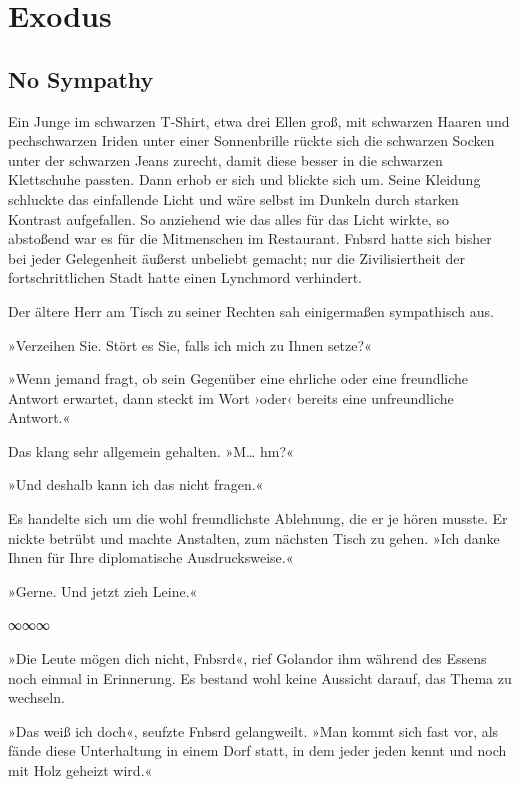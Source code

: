 \part{Exodus}

\chapter{No Sympathy}

Ein Junge im schwarzen T-Shirt, etwa drei Ellen groß, mit schwarzen Haaren und pechschwarzen Iriden unter einer Sonnenbrille rückte sich die schwarzen Socken unter der schwarzen Jeans zurecht, damit diese besser in die schwarzen Klettschuhe passten. Dann erhob er sich und blickte sich um. Seine Kleidung schluckte das einfallende Licht und wäre selbst im Dunkeln durch starken Kontrast aufgefallen. So anziehend wie das alles für das Licht wirkte, so abstoßend war es für die Mitmenschen im Restaurant. Fnbsrd hatte sich bisher bei jeder Gelegenheit äußerst unbeliebt gemacht; nur die Zivilisiertheit der fortschrittlichen Stadt hatte einen Lynchmord verhindert.

Der ältere Herr am Tisch zu seiner Rechten sah einigermaßen sympathisch aus.

»Verzeihen Sie. Stört es Sie, falls ich mich zu Ihnen setze?«

»Wenn jemand fragt, ob sein Gegenüber eine ehrliche oder eine freundliche Antwort erwartet, dann steckt im Wort ›oder‹ bereits eine unfreundliche Antwort.«

Das klang sehr allgemein gehalten. »M… hm?«

»Und deshalb kann ich das nicht fragen.«

Es handelte sich um die wohl freundlichste Ablehnung, die er je hören musste. Er nickte betrübt und machte Anstalten, zum nächsten Tisch zu gehen. »Ich danke Ihnen für Ihre diplomatische Ausdrucksweise.«

»Gerne. Und jetzt zieh Leine.«

\begin{center}
∞∞∞
\end{center}

»Die Leute mögen dich nicht, Fnbsrd«, rief Golandor ihm während des Essens noch einmal in Erinnerung. Es bestand wohl keine Aussicht darauf, das Thema zu wechseln.

»Das weiß ich doch«, seufzte Fnbsrd gelangweilt. »Man kommt sich fast vor, als fände diese Unterhaltung in einem Dorf statt, in dem jeder jeden kennt und noch mit Holz geheizt wird.«


